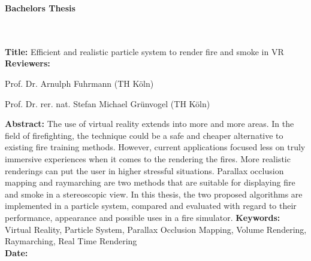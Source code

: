 \begin{flushleft}
    \begin{huge}
        \textbf{Bachelors Thesis}
    \end{huge}
    ~\\
    ~\\
    \textbf{Title:} Efficient and realistic particle system to render fire and smoke in VR
    ~\\
    \doublespacing
    \textbf{Reviewers:}
    \begin{description}
        \vspace{-0.2cm}
        \itemsep-8pt
        \item[–]
            Prof. Dr. Arnulph Fuhrmann (TH Köln)
        \item[–]
            Prof. Dr. rer. nat. Stefan Michael Grünvogel (TH Köln)
    \end{description}
    \vspace{-0.4cm}
    \singlespacing
    \textbf{Abstract:}
    The use of virtual reality extends into more and more areas.
    In the field of firefighting, the technique could be a safe and cheaper 
    alternative to existing fire training methods. 
    However, current applications focused less on truly immersive experiences when it 
    comes to the rendering the fires. More realistic renderings can put the user in higher
    stressful situations. 
    Parallax occlusion mapping and raymarching are two methods that are suitable 
    for displaying fire and smoke in a stereoscopic view. 
    In this thesis, the two proposed algorithms are implemented in a particle system, compared and 
    evaluated with regard to their performance, appearance and possible uses in a fire simulator.
    \singlespacing
    \textbf{Keywords:} Virtual Reality, Particle System, Parallax Occlusion Mapping, Volume Rendering, Raymarching, Real Time Rendering\\
    \doublespacing
    \textbf{Date:}
\end{flushleft}

